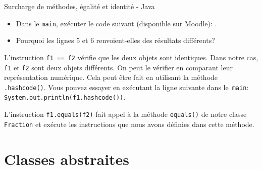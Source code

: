 \begin{Exercice}[30 minutes]{Surcharge de méthodes, égalité et identité - Java}
\begin{itemize}
	\begin{conseil}
		En Java, pour vérifier que deux objets sont de même type, vous pouvez accéder à la classe de chacun des éléments en utilisant la méthode \lstinline{.getClass()} et les comparer. Une fois que vous avez vérifé le type de l'objet \lstinline{other} passé comme argument, le convertir en \lstinline{Fraction} (utiliser \href{https://moodle.unil.ch/mod/resource/view.php?id=1965120}{type casting de la semaine 3}).
	\end{conseil}
	\item Dans le \lstinline{main}, exécuter le code suivant (disponible sur Moodle): 
	.
	\item Pourquoi les lignes 5 et 6 renvoient-elles des résultats différents?	
\end{itemize}

\begin{solution}
	

	L'instruction \lstinline{f1 == f2} vérifie que les deux objets sont identiques. Dans notre cas, \lstinline{f1} et \lstinline{f2} sont deux objets différents. On peut le vérifier en comparant leur représentation numérique. Cela peut être fait en utilisant la méthode \lstinline{.hashcode()}. Vous pouvez essayer en exécutant la ligne suivante dans le~\lstinline{main}: \lstinline{System.out.println(f1.hashcode())}.

	L'instruction \lstinline{f1.equals(f2)} fait appel à la méthode \lstinline{equals()} de notre classe \lstinline{Fraction} et exécute les instructions que nous avons définies dans cette méthode.
\end{solution}





\end{Exercice}
	

\section{Classes abstraites}

